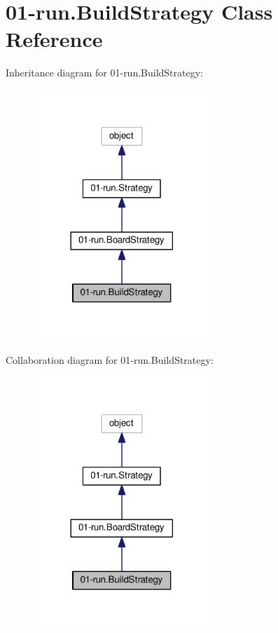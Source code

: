 \hypertarget{class01-run_1_1BuildStrategy}{}\section{01-\/run.Build\+Strategy Class Reference}
\label{class01-run_1_1BuildStrategy}


Inheritance diagram for 01-\/run.Build\+Strategy\+:
\nopagebreak
\begin{figure}[H]
\begin{center}
\leavevmode
\includegraphics[width=189pt]{class01-run_1_1BuildStrategy__inherit__graph}
\end{center}
\end{figure}


Collaboration diagram for 01-\/run.Build\+Strategy\+:
\nopagebreak
\begin{figure}[H]
\begin{center}
\leavevmode
\includegraphics[width=189pt]{class01-run_1_1BuildStrategy__coll__graph}
\end{center}
\end{figure}
